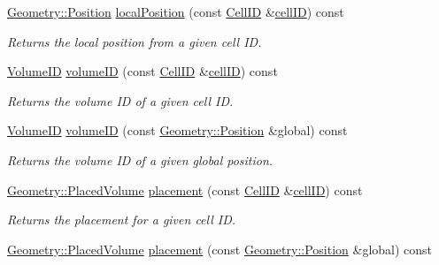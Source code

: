 \begin{DoxyCompactItemize}
\hyperlink{namespace_d_d4hep_1_1_geometry_a55083902099d03506c6db01b80404900}{Geometry\+::\+Position} \hyperlink{class_d_d4hep_1_1_d_d_rec_1_1_i_d_decoder_a047e575f6ac1fc4d7b443dbe4347816c}{local\+Position} (const \hyperlink{namespace_d_d4hep_1_1_d_d_rec_af5cecc2e566eeaedb430b92df23971d4}{Cell\+ID} \&\hyperlink{class_d_d4hep_1_1_d_d_rec_1_1_i_d_decoder_abdd26643ae2f9f70de21b3a4699799bb}{cell\+ID}) const
\begin{DoxyCompactList}\small\item\em Returns the local position from a given cell ID. \end{DoxyCompactList}\item 
\hyperlink{namespace_d_d4hep_1_1_d_d_rec_a5b5fea15b3678944e1aba487a746bdcb}{Volume\+ID} \hyperlink{class_d_d4hep_1_1_d_d_rec_1_1_i_d_decoder_aec5d8e981dbb6e43171ceed938f4ad1c}{volume\+ID} (const \hyperlink{namespace_d_d4hep_1_1_d_d_rec_af5cecc2e566eeaedb430b92df23971d4}{Cell\+ID} \&\hyperlink{class_d_d4hep_1_1_d_d_rec_1_1_i_d_decoder_abdd26643ae2f9f70de21b3a4699799bb}{cell\+ID}) const
\begin{DoxyCompactList}\small\item\em Returns the volume ID of a given cell ID. \end{DoxyCompactList}\item 
\hyperlink{namespace_d_d4hep_1_1_d_d_rec_a5b5fea15b3678944e1aba487a746bdcb}{Volume\+ID} \hyperlink{class_d_d4hep_1_1_d_d_rec_1_1_i_d_decoder_aaf4840710b3a94beecfb2208baf3938d}{volume\+ID} (const \hyperlink{namespace_d_d4hep_1_1_geometry_a55083902099d03506c6db01b80404900}{Geometry\+::\+Position} \&global) const
\begin{DoxyCompactList}\small\item\em Returns the volume ID of a given global position. \end{DoxyCompactList}\item 
\hyperlink{class_d_d4hep_1_1_geometry_1_1_placed_volume}{Geometry\+::\+Placed\+Volume} \hyperlink{class_d_d4hep_1_1_d_d_rec_1_1_i_d_decoder_ab806215c7006028504ae0cfdef1e90d2}{placement} (const \hyperlink{namespace_d_d4hep_1_1_d_d_rec_af5cecc2e566eeaedb430b92df23971d4}{Cell\+ID} \&\hyperlink{class_d_d4hep_1_1_d_d_rec_1_1_i_d_decoder_abdd26643ae2f9f70de21b3a4699799bb}{cell\+ID}) const
\begin{DoxyCompactList}\small\item\em Returns the placement for a given cell ID. \end{DoxyCompactList}\item 
\hyperlink{class_d_d4hep_1_1_geometry_1_1_placed_volume}{Geometry\+::\+Placed\+Volume} \hyperlink{class_d_d4hep_1_1_d_d_rec_1_1_i_d_decoder_a8c54faa66d19d5774e1ec0764f3bc723}{placement} (const \hyperlink{namespace_d_d4hep_1_1_geometry_a55083902099d03506c6db01b80404900}{Geometry\+::\+Position} \&global) const

\end{DoxyCompactItemize}
